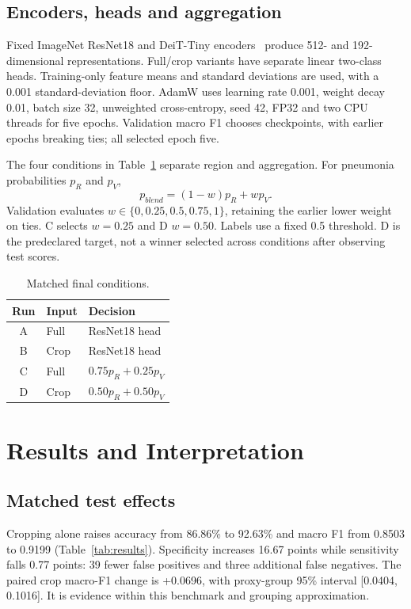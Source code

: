 \documentclass[conference]{IEEEtran}
\begin{document}
\subsection{Encoders, heads and aggregation}
Fixed ImageNet ResNet18 and DeiT-Tiny encoders~\cite{deit} produce 512- and 192-dimensional representations. Full/crop variants have separate linear two-class heads. Training-only feature means and standard deviations are used, with a 0.001 standard-deviation floor. AdamW uses learning rate 0.001, weight decay 0.01, batch size 32, unweighted cross-entropy, seed 42, FP32 and two CPU threads for five epochs. Validation macro F1 chooses checkpoints, with earlier epochs breaking ties; all selected epoch five.

The four conditions in Table~\ref{tab:conditions} separate region and aggregation. For pneumonia probabilities $p_R$ and $p_V$,
\begin{equation}p_{blend}=(1-w)p_R+wp_V.\end{equation}
Validation evaluates $w\in\{0,0.25,0.5,0.75,1\}$, retaining the earlier lower weight on ties. C selects $w=0.25$ and D $w=0.50$. Labels use a fixed 0.5 threshold. D is the predeclared target, not a winner selected across conditions after observing test scores.
\begin{table}[!t]\caption{Matched final conditions.}\label{tab:conditions}\centering\footnotesize\begin{tabularx}{\columnwidth}{@{}clX@{}}\toprule\rowcolor{RRlight}Run & Input & Decision\\\midrule
A & Full & ResNet18 head\\B & Crop & ResNet18 head\\C & Full & $0.75p_R+0.25p_V$\\D & Crop & $0.50p_R+0.50p_V$\\\bottomrule\end{tabularx}\end{table}

\section{Results and Interpretation}
\subsection{Matched test effects}
Cropping alone raises accuracy from 86.86\% to 92.63\% and macro F1 from 0.8503 to 0.9199 (Table~\ref{tab:results}). Specificity increases 16.67 points while sensitivity falls 0.77 points: 39 fewer false positives and three additional false negatives. The paired crop macro-F1 change is +0.0696, with proxy-group 95\% interval [0.0404, 0.1016]. It is evidence within this benchmark and grouping approximation.
\end{document}
